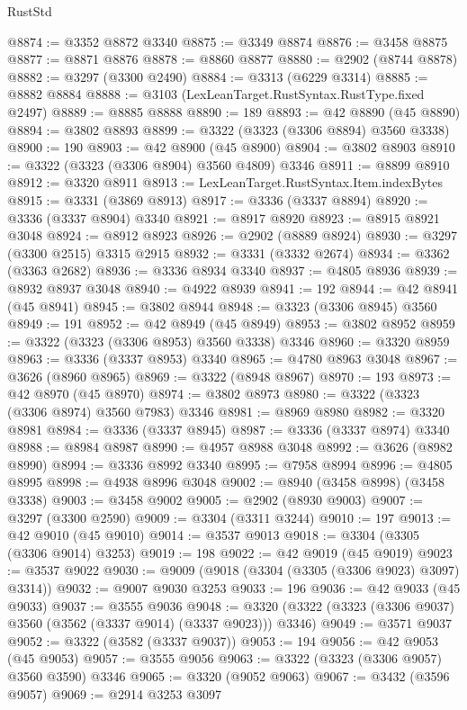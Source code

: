 \begin{lexlean}{RustStd}
\begin{coremodule}
@8874 := @3352 @8872 @3340
@8875 := @3349 @8874
@8876 := @3458 @8875
@8877 := @8871 @8876
@8878 := @8860 @8877
@8880 := @2902 (@8744 @8878)
@8882 := @3297 (@3300 @2490)
@8884 := @3313 (@6229 @3314)
@8885 := @8882 @8884
@8888 := @3103 (LexLeanTarget.RustSyntax.RustType.fixed @2497)
@8889 := @8885 @8888
@8890 := 189
@8893 := @42 @8890 (@45 @8890)
@8894 := @3802 @8893
@8899 := @3322 (@3323 (@3306 @8894) @3560 @3338)
@8900 := 190
@8903 := @42 @8900 (@45 @8900)
@8904 := @3802 @8903
@8910 := @3322 (@3323 (@3306 @8904) @3560 @4809) @3346
@8911 := @8899 @8910
@8912 := @3320 @8911
@8913 := LexLeanTarget.RustSyntax.Item.indexBytes
@8915 := @3331 (@3869 @8913)
@8917 := @3336 (@3337 @8894)
@8920 := @3336 (@3337 @8904) @3340
@8921 := @8917 @8920
@8923 := @8915 @8921 @3048
@8924 := @8912 @8923
@8926 := @2902 (@8889 @8924)
@8930 := @3297 (@3300 @2515) @3315 @2915
@8932 := @3331 (@3332 @2674)
@8934 := @3362 (@3363 @2682)
@8936 := @3336 @8934 @3340
@8937 := @4805 @8936
@8939 := @8932 @8937 @3048
@8940 := @4922 @8939
@8941 := 192
@8944 := @42 @8941 (@45 @8941)
@8945 := @3802 @8944
@8948 := @3323 (@3306 @8945) @3560
@8949 := 191
@8952 := @42 @8949 (@45 @8949)
@8953 := @3802 @8952
@8959 := @3322 (@3323 (@3306 @8953) @3560 @3338) @3346
@8960 := @3320 @8959
@8963 := @3336 (@3337 @8953) @3340
@8965 := @4780 @8963 @3048
@8967 := @3626 (@8960 @8965)
@8969 := @3322 (@8948 @8967)
@8970 := 193
@8973 := @42 @8970 (@45 @8970)
@8974 := @3802 @8973
@8980 := @3322 (@3323 (@3306 @8974) @3560 @7983) @3346
@8981 := @8969 @8980
@8982 := @3320 @8981
@8984 := @3336 (@3337 @8945)
@8987 := @3336 (@3337 @8974) @3340
@8988 := @8984 @8987
@8990 := @4957 @8988 @3048
@8992 := @3626 (@8982 @8990)
@8994 := @3336 @8992 @3340
@8995 := @7958 @8994
@8996 := @4805 @8995
@8998 := @4938 @8996 @3048
@9002 := @8940 (@3458 @8998) (@3458 @3338)
@9003 := @3458 @9002
@9005 := @2902 (@8930 @9003)
@9007 := @3297 (@3300 @2590)
@9009 := @3304 (@3311 @3244)
@9010 := 197
@9013 := @42 @9010 (@45 @9010)
@9014 := @3537 @9013
@9018 := @3304 (@3305 (@3306 @9014) @3253)
@9019 := 198
@9022 := @42 @9019 (@45 @9019)
@9023 := @3537 @9022
@9030 := @9009 (@9018 (@3304 (@3305 (@3306 @9023) @3097) @3314))
@9032 := @9007 @9030 @3253
@9033 := 196
@9036 := @42 @9033 (@45 @9033)
@9037 := @3555 @9036
@9048 := @3320 (@3322 (@3323 (@3306 @9037) @3560 (@3562 (@3337 @9014) (@3337 @9023))) @3346)
@9049 := @3571 @9037
@9052 := @3322 (@3582 (@3337 @9037))
@9053 := 194
@9056 := @42 @9053 (@45 @9053)
@9057 := @3555 @9056
@9063 := @3322 (@3323 (@3306 @9057) @3560 @3590) @3346
@9065 := @3320 (@9052 @9063)
@9067 := @3432 (@3596 @9057)
@9069 := @2914 @3253 @3097

\end{coremodule}
\end{lexlean}
